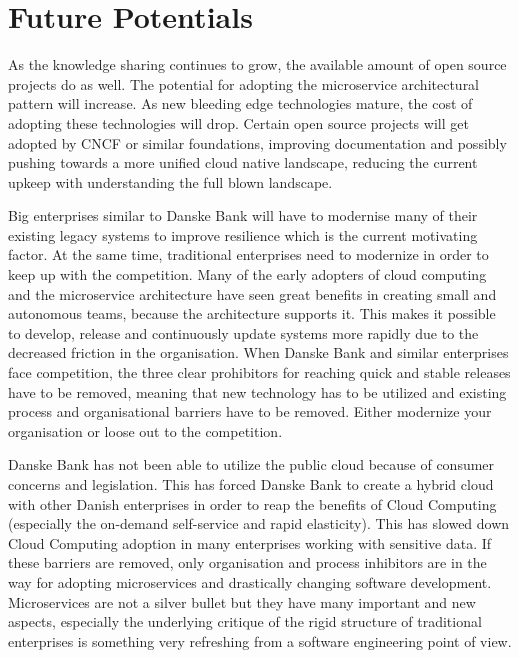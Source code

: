 \section{Future Potentials}
As the knowledge sharing continues to grow, the available amount of open source projects do as well. The potential for adopting the microservice architectural pattern will increase. As new bleeding edge technologies mature, the cost of adopting these technologies will drop. Certain open source projects will get adopted by CNCF or similar foundations, improving documentation and possibly pushing towards a more unified cloud native landscape, reducing the current upkeep with understanding the full blown landscape.

Big enterprises similar to Danske Bank will have to modernise many of their existing legacy systems to improve resilience which is the current motivating factor. At the same time, traditional enterprises need to modernize in order to keep up with the competition. Many of the early adopters of cloud computing and the microservice architecture have seen great benefits in creating small and autonomous teams, because the architecture supports it. This makes it possible to develop, release and continuously update systems more rapidly due to the decreased friction in the organisation. When Danske Bank and similar enterprises face competition, the three clear prohibitors for reaching quick and stable releases have to be removed, meaning that new technology has to be utilized and existing process and organisational barriers have to be removed. Either modernize your organisation or loose out to the competition.

Danske Bank has not been able to utilize the public cloud because of consumer concerns and legislation. This has forced Danske Bank to create a hybrid cloud with other Danish enterprises in order to reap the benefits of Cloud Computing (especially the on-demand self-service and rapid elasticity). This has slowed down Cloud Computing adoption in many enterprises working with sensitive data. If these barriers are removed, only organisation and process inhibitors are in the way for adopting microservices and drastically changing software development. Microservices are not a silver bullet but they have many important and new aspects, especially the underlying critique of the rigid structure of traditional enterprises is something very refreshing from a software engineering point of view.




